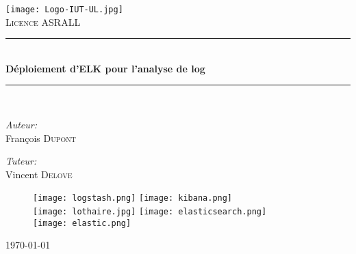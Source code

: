 \begin{titlepage}
\begin{center}
 \newcommand{\HRule}{\rule{\linewidth}{0.5mm}}

\texttt{[image: Logo-IUT-UL.jpg]}\\[1cm]


\textsc{\LARGE Licence ASRALL}\\[0.5cm]

\HRule \\[0.4cm]
{ \huge \bfseries Déploiement d'ELK pour l'analyse de log\\[0.4cm] }

\HRule \\[1.5cm]

\noindent
\begin{minipage}{0.5\textwidth}
\begin{flushleft} \large
\emph{Auteur:}\\
François \textsc{Dupont}\\
\end{flushleft}
\end{minipage}%
\begin{minipage}{0.5\textwidth}
\begin{flushright} \large
\emph{Tuteur:} \\
Vincent \textsc{Delove}
\end{flushright}
\end{minipage}

%

\vfill

\begin{figure}[h]
    \centering
    \texttt{[image: logstash.png]}
    \hfill
    \texttt{[image: kibana.png]}
    \\[0.2cm]
    \texttt{[image: lothaire.jpg]}
    \hfill
    \texttt{[image: elasticsearch.png]}
    \\
    \texttt{[image: elastic.png]}
\end{figure}

\vfill
{\Large \today}%

\end{center}
\end{titlepage}
